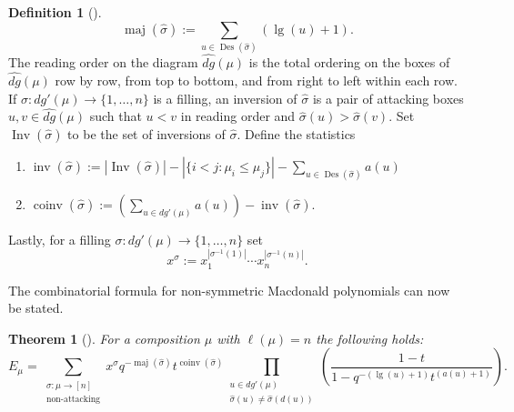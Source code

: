 \documentclass[11pt]{article}
\newtheorem{thm}[theo]{Theorem}
\theoremstyle{definition}
\newtheorem{defi}[theo]{Definition}
\numberwithin{equation}{section}
\DeclareMathOperator{\Des}{Des}
\DeclareMathOperator{\maj}{maj}
\DeclareMathOperator{\Inv}{Inv}
\DeclareMathOperator{\inv}{inv}
\DeclareMathOperator{\coinv}{coinv}
\DeclareMathOperator{\mathleg}{lg}
\begin{document}
\begin{defi}[\cite{haglund2007combinatorial}]
$$\maj(\widehat{\sigma}):= \sum_{u \in \Des(\widehat{\sigma})} (\mathleg(u)+1).$$
The reading order on the diagram $\widehat{dg}(\mu)$ is the total ordering on the boxes of $\widehat{dg}(\mu)$ row by row, from top to bottom, and from right to left within each row. If $\sigma: dg'(\mu) \rightarrow \{1,\ldots,n\}$ is a filling, an inversion of $\widehat{\sigma}$ is a pair of attacking boxes $u,v \in \widehat{dg}(\mu)$ such that $u < v$ in reading order and $\widehat{\sigma}(u) > \widehat{\sigma}(v).$ Set $\Inv(\widehat{\sigma})$ to be the set of inversions of $\widehat{\sigma}$. Define the statistics 
\begin{enumerate}
    \item $\inv(\widehat{\sigma}):= |\Inv(\widehat{\sigma})| -|\{i<j: \mu_i \leq \mu_j\}| - \sum_{u \in \Des(\widehat{\sigma})} a(u)$
    \item $\coinv(\widehat{\sigma}):= \left( \sum_{u \in dg'(\mu)} a(u) \right) -\inv(\widehat{\sigma}).$
    \end{enumerate}
Lastly, for a filling $\sigma:dg'(\mu) \rightarrow \{1,\ldots,n\}$ set $$x^{\sigma}:= x_1^{|\sigma^{-1}(1)|}\cdots x_n^{|\sigma^{-1}(n)|}.$$
\end{defi}

The combinatorial formula for non-symmetric Macdonald polynomials can now be stated.

\begin{thm}[{\cite[Thm. 3.5.1]{haglund2007combinatorial}}] \label{HHL}
For a composition $\mu$ with $\ell(\mu) = n$ the following holds:
    $$E_{\mu} = \sum_{\substack{\sigma: \mu \rightarrow [n]\\ \text{non-attacking}}} x^{\sigma}q^{-\maj(\widehat{\sigma})}t^{\coinv(\widehat{\sigma})} \prod_{\substack{u \in dg'(\mu) \\ \widehat{\sigma}(u) \neq \widehat{\sigma}(d(u))}} \left( \frac{1-t}{1-q^{-(\mathleg(u)+1)}t^{(a(u)+1)}} \right). $$
\end{thm}
\end{document}
